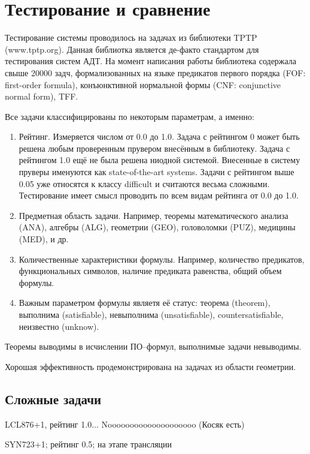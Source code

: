 \section{Тестирование и сравнение}

Тестирование системы проводилось на задачах из библиотеки TPTP (www.tptp.org). Данная библиотка является де-факто стандартом для тестирования систем АДТ. На момент написания работы библиотека содержала свыше 20000 задч, формализованных на языке предикатов первого порядка (FOF: first-order formula), конъюнктивной нормальной формы (CNF: conjunctive normal form), TFF.

Все задачи классифицированы по некоторым параметрам, а именно:
\begin{enumerate}
\item Рейтинг. Измеряется числом от 0.0 до 1.0. Задача с рейтингом 0 может быть решена любым проверенным прувером внесённым в библиотеку. Задача с рейтингом 1.0 ещё не была решена ниодной системой. Внесенные в систему пруверы именуются как state-of-the-art systems. Задачи с рейтингом выше 0.05 уже относятся к классу difficult и считаются весьма сложными. Тестирование имеет смысл проводить по всем видам рейтинга от 0.0 до 1.0.
\item Предметная область задачи. Например, теоремы математического анализа (ANA), алгебры (ALG), геометрии (GEO), головоломки (PUZ), медицины (MED), и др.
\item Количественные характеристики формулы. Например, количество предикатов, функциональных символов, наличие предиката равенства, общий объем формулы.
\item Важным параметром формулы являетя её статус: теорема (theorem), выполнима (satisfiable), невыполнима (unsatisfiable), countersatisfiable, неизвестно (unknow).
\end{enumerate}

Теоремы выводимы в исчислении ПО--формул, выполнимые задачи невыводимы.

Хорошая эффективность продемонстрирована на задачах из области геометрии. 



\subsection{Сложные задачи}
LCL876+1, рейтинг 1.0... Noooooooooooooooooooo (Косяк есть)

SYN723+1; рейтинг 0.5; на этапе трансляции

